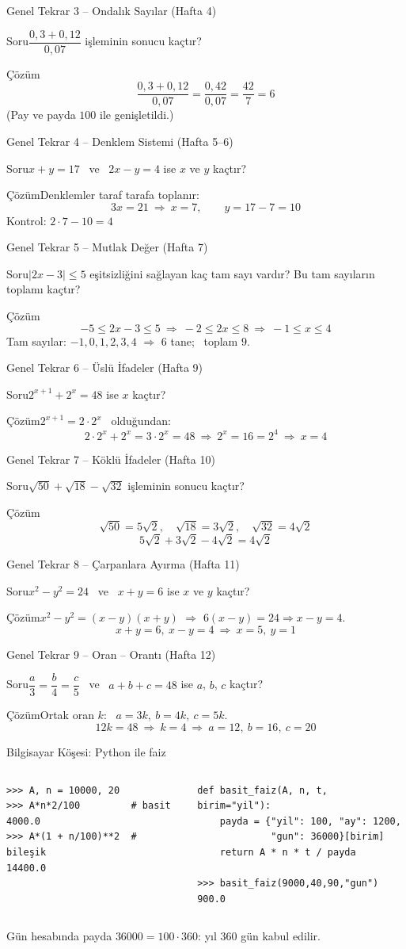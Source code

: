 \documentclass[aspectratio=169,11pt,handout]{beamer}
\newcommand{\soru}[3]{%
\begin{frame}{#1}
  \begin{block}{Soru}\large #2\end{block}
  \pause
  \begin{exampleblock}{Çözüm}\large #3\end{exampleblock}
\end{frame}}
\begin{document}
\soru{Genel Tekrar 3 -- Ondalık Sayılar (Hafta 4)}
{\(\dfrac{0{,}3+0{,}12}{0{,}07}\) işleminin sonucu kaçtır?}
{\[\frac{0{,}3+0{,}12}{0{,}07}=\frac{0{,}42}{0{,}07}=\frac{42}{7}=6\]
(Pay ve payda \(100\) ile genişletildi.)}

\soru{Genel Tekrar 4 -- Denklem Sistemi (Hafta 5--6)}
{\(x+y=17\) \ ve \ \(2x-y=4\) ise \(x\) ve \(y\) kaçtır?}
{Denklemler taraf tarafa toplanır:
\[3x=21\ \Rightarrow\ x=7,\qquad y=17-7=10\]
Kontrol: \(2\cdot 7-10=4\) \checkmark}

\soru{Genel Tekrar 5 -- Mutlak Değer (Hafta 7)}
{\(|2x-3|\le 5\) eşitsizliğini sağlayan kaç tam sayı vardır? Bu tam sayıların toplamı kaçtır?}
{\[-5\le 2x-3\le 5\ \Rightarrow\ -2\le 2x\le 8\ \Rightarrow\ -1\le x\le 4\]
Tam sayılar: \(-1,0,1,2,3,4\) \(\Rightarrow\) \(6\) tane; \ toplam \(9\).}

\soru{Genel Tekrar 6 -- Üslü İfadeler (Hafta 9)}
{\(2^{x+1}+2^{x}=48\) ise \(x\) kaçtır?}
{\(2^{x+1}=2\cdot 2^x\) \ olduğundan:
\[2\cdot 2^x+2^x=3\cdot 2^x=48\ \Rightarrow\ 2^x=16=2^4\ \Rightarrow\ x=4\]}

\soru{Genel Tekrar 7 -- Köklü İfadeler (Hafta 10)}
{\(\sqrt{50}+\sqrt{18}-\sqrt{32}\) işleminin sonucu kaçtır?}
{\[\sqrt{50}=5\sqrt{2},\quad \sqrt{18}=3\sqrt{2},\quad \sqrt{32}=4\sqrt{2}\]
\[5\sqrt{2}+3\sqrt{2}-4\sqrt{2}=4\sqrt{2}\]}

\soru{Genel Tekrar 8 -- Çarpanlara Ayırma (Hafta 11)}
{\(x^2-y^2=24\) \ ve \ \(x+y=6\) ise \(x\) ve \(y\) kaçtır?}
{\(x^2-y^2=(x-y)(x+y)\) \(\Rightarrow\) \(6(x-y)=24\Rightarrow x-y=4\).
\[x+y=6,\ x-y=4\ \Rightarrow\ x=5,\ y=1\]}

\soru{Genel Tekrar 9 -- Oran -- Orantı (Hafta 12)}
{\(\dfrac{a}{3}=\dfrac{b}{4}=\dfrac{c}{5}\) \ ve \ \(a+b+c=48\) ise \(a\), \(b\), \(c\) kaçtır?}
{Ortak oran \(k\): \ \(a=3k,\ b=4k,\ c=5k\).
\[12k=48\ \Rightarrow\ k=4\ \Rightarrow\ a=12,\ b=16,\ c=20\]}

\begin{frame}[fragile]{Bilgisayar Köşesi: Python ile faiz}
\begin{columns}[t]
\small
\begin{verbatim}
>>> A, n = 10000, 20
>>> A*n*2/100         # basit
4000.0
>>> A*(1 + n/100)**2  # bileşik
14400.0
\end{verbatim}
\small
\begin{verbatim}
def basit_faiz(A, n, t, birim="yil"):
    payda = {"yil": 100, "ay": 1200,
             "gun": 36000}[birim]
    return A * n * t / payda

>>> basit_faiz(9000,40,90,"gun")
900.0
\end{verbatim}
\end{columns}
\small Gün hesabında payda \(36000=100\cdot 360\): yıl \(360\) gün kabul edilir.
\end{frame}
\end{document}
